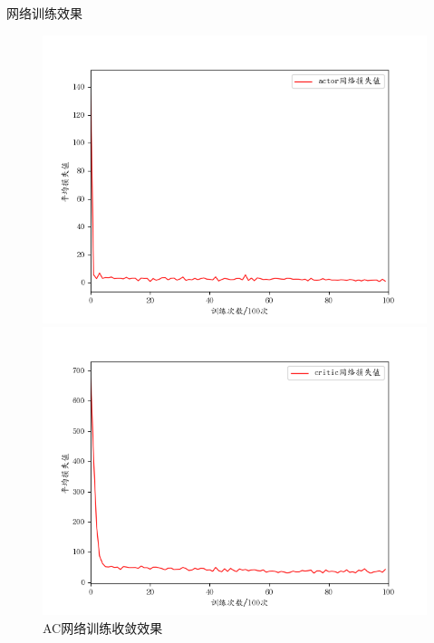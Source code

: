 \documentclass{beamer}
\begin{document}
\begin{frame}{网络训练效果}

    \begin{figure}[htbp]
            \begin{minipage}{0.49\linewidth}
		  \centering
            \includegraphics[scale=0.4]{pic/actor_x.png}
	   \end{minipage}
	   \begin{minipage}{0.49\linewidth}
		  \centering
            \includegraphics[scale=0.4]{pic/critic_x.png}
	   \end{minipage}
            \caption{AC网络训练收敛效果}
    \end{figure}
\end{frame}
\end{document}
